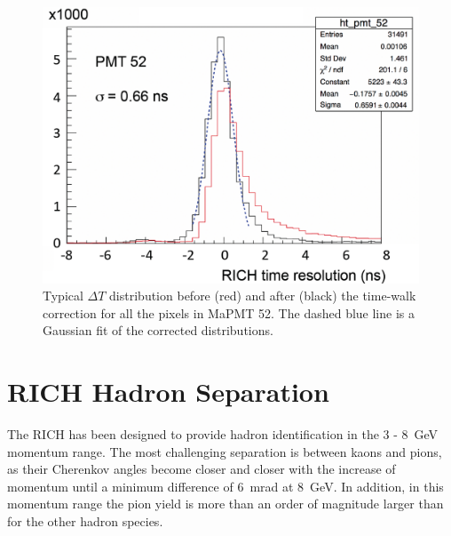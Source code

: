 \documentclass[5p,times,twocolumn]{elsarticle}
\def\dT{$\Delta T$ }
\begin{document}
\begin{figure}[t]
\begin{center}
\includegraphics[width=1.0\columnwidth]{time_walk_reso.png}
\end{center}
\caption{Typical \dT distribution before (red) and after (black) the time-walk correction for all the pixels in MaPMT
  52. The dashed blue line is a Gaussian fit of the corrected distributions.}
\label{Fig:ResoTime}
\end{figure}

\section{RICH Hadron Separation}
\label{sec:HadronID}

The RICH has been designed to provide hadron identification in the 3 - 8~GeV momentum range. The most
challenging separation is between kaons and pions, as their Cherenkov angles become closer and closer with the
increase of momentum until a minimum difference of 6~mrad at 8~GeV. In addition, in this momentum range the
pion yield is more than an order of magnitude larger than for the other hadron species.

\end{document}
